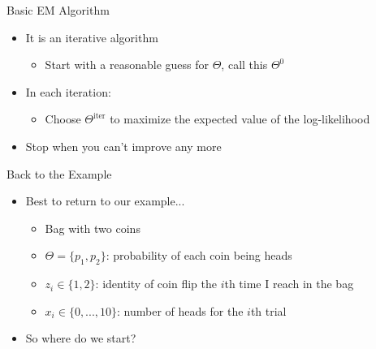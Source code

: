 \documentclass[aspectratio=169]{beamer}
\begin{document}
\begin{frame}{Basic EM Algorithm}

\begin{itemize}
\item It is an iterative algorithm
	\begin{itemize}
	\item Start with a reasonable guess  for $\Theta$, call this $\Theta^0$
	\end{itemize}
\item In each iteration:
	\begin{itemize}
	\item Choose $\Theta^{\textrm{iter}}$ to maximize the expected value of the log-likelihood
	\end{itemize}
\item Stop when you can't improve any more
\end{itemize}
\end{frame}
\begin{frame}{Back to the Example}

\begin{itemize}
\item Best to return to our example...
	\begin{itemize}
	\item Bag with two coins
	\item $\Theta = \{p_1, p_2\}$: probability of each coin being heads
	\item $z_i \in \{1, 2\}$: identity of coin flip the $i$th time I reach in the bag
	\item $x_i \in \{0, ..., 10\}$: number of heads for the $i$th trial
	\end{itemize}
\item So where do we start?
\end{itemize}
\end{frame}
\end{document}
